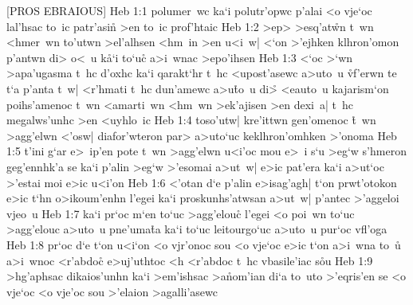 [PROS EBRAIOUS]
\vs Heb 1:1
polumer~wc
ka`i
polutr'opwc
p'alai
<o
vje`oc
lal'hsac
to~ic
patr'asi\r{n}
>en
to~ic
prof'htaic\bibvsend
\vs Heb 1:2
>ep>
>esq'at\r{w}n
t~wn
<hmer~wn
to'utwn
>el'alhsen
<hm~in
>en
u<i~w|
<`on
>'ejhken
klhron'omon
p'antwn
di>
o<~u
k\r{a}`i
to`uc\r{}
a>i~wnac
>epo'ihsen\bibvsend
\vs Heb 1:3
<`oc
>`wn
>apa'ugasma
t~hc
d'oxhc
ka`i
qarakt`hr
t~hc
<upost'asewc
a>uto~u
\r{vf}'erwn
te
t`a
p'anta
t~w|
<r'hmati
t~hc
dun'amewc
a>u\r{t}o~u
di>\r{}
<eauto~u
kajarism`on
poihs'amenoc
t~wn
<amarti~wn
<hm~wn
>ek'ajisen
>en
dexi~a|
t~hc
megalws'unhc
>en
<uyhlo~ic\bibvsend
\vs Heb 1:4
toso'utw|
kre'ittwn
gen'omenoc
\r{t}~wn
>agg'elwn
<'osw|
diafor'wteron
par>
a>uto`uc
keklhron'omhken
>'onoma\bibvsend
\vs Heb 1:5
t'ini
g`ar
e>~ip'en
pote
t~wn
>agg'elwn
u<i'oc
mou
e>~i
s`u
>eg`w
s'hmeron
geg'ennhk'a
se
ka`i
p'alin
>eg`w
>'esomai
a>ut~w|
e>ic
pat'era
ka`i
a>ut`oc
>'estai
moi
e>ic
u<i'on\bibvsend
\vs Heb 1:6
<'otan
d`e
p'alin
e>isag'agh|
t`on
prwt'otokon
e>ic
t`hn
o>ikoum'enhn
l'egei
ka`i
proskunhs'atwsan
a>ut~w|
p'antec
>'aggeloi
vjeo~u\bibvsend
\vs Heb 1:7
ka`i
pr`oc
m`en
to`uc
>agg'elou\r{c}
l'egei
<o
poi~wn
to`uc
>agg'elouc
a>uto~u
pne'uma\r{t}a
ka`i
to`uc
leitourgo`uc
a>uto~u
pur`oc
vfl'oga\bibvsend
\vs Heb 1:8
pr`oc
d`e
t`on
u<i`on
<o
vjr'onoc
sou
<o
vje`oc
e>ic
t`on
a>i~wna
to~u\r{}
a>i~wnoc
<r'abdoc\r{}
e>uj'uthtoc
<h
<r'abdoc
t~hc
vbasile'iac
s\r{o}u\bibvsend
{}
\vs Heb 1:9
>hg'aphsac
dikaios'unhn
ka`i
>em'ishsac
>a\r{n}om'ian
di`a
to~uto
>'eqris'en
se
<o
vje`oc
<o
vje'oc
sou
>'elaion
>agalli'asewc
